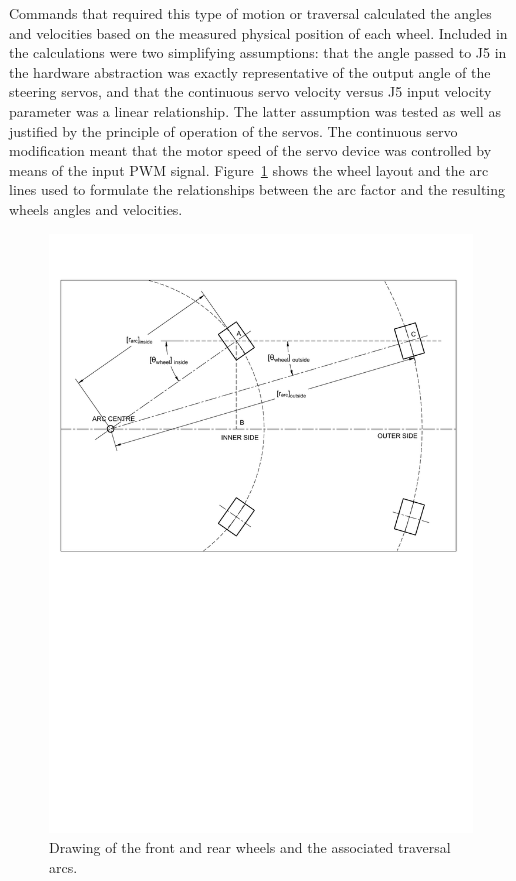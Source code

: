         Commands that required this type of motion or traversal calculated the angles and velocities based on the measured physical position of each wheel. Included in the calculations were two simplifying assumptions: that the angle passed to J5 in the hardware abstraction was exactly representative of the output angle of the steering servos, and that the continuous servo velocity versus J5 input velocity parameter was a linear relationship. The latter assumption was tested as well as justified by the principle of operation of the servos. The continuous servo modification meant that the motor speed of the servo device was controlled by means of the input PWM signal. Figure~\ref{fig:softDev-arcCalculations} shows the wheel layout and the arc lines used to formulate the relationships between the arc factor and the resulting wheels angles and velocities.
        
        \begin{figure}[h!]
          \centering
          \includegraphics[clip, trim=1cm 14cm 1cm 3cm,width=1\linewidth]{figures/arcCalculations}
          \caption[Drawing of the front and rear wheels and the associated traversal arcs.]{Drawing of the front and rear wheels and the associated traversal arcs.}
          \label{fig:softDev-arcCalculations}
        \end{figure}
        
